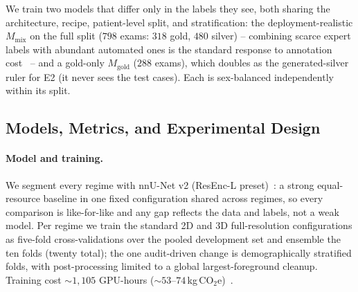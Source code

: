 We train two models that differ only in the labels they see, both sharing the
architecture, recipe, patient-level split, and stratification: the deployment-realistic
$M_{\mathrm{mix}}$ on the full split ($798$ exams: $318$ gold, $480$ silver) -- combining
scarce expert labels with abundant automated ones is the standard response to annotation
cost~\cite{tajbakhsh2020embracing} -- and a gold-only $M_{\mathrm{gold}}$ ($288$ exams),
which doubles as the generated-silver ruler for E2 (it never sees the test cases). Each
is sex-balanced independently within its split.

\subsection{Models, Metrics, and Experimental Design}
\label{sec:model}

\paragraph{Model and training.}
We segment every regime with nnU-Net v2 (ResEnc-L
preset)~\cite{isensee2021nnunet,isensee2024revisited}: a strong equal-resource baseline
in one fixed configuration shared across regimes, so every comparison is like-for-like
and any gap reflects the data and labels, not a weak model. Per regime we train the
standard 2D and 3D full-resolution configurations as five-fold cross-validations over
the pooled development set and ensemble the ten folds (twenty total); the one
audit-driven change is demographically stratified folds, with post-processing limited
to a global largest-foreground cleanup. Training cost ${\sim}1{,}105$ GPU-hours
(${\sim}53$--$74$\,kg\,CO$_2$e)~\cite{lacoste2019quantifying,dea_keyfigures2023}.

